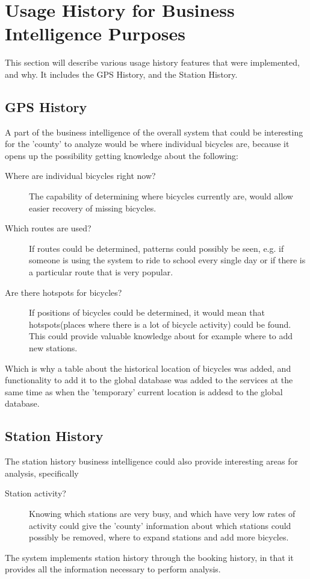 \section{Usage History for Business Intelligence Purposes}
This section will describe various usage history features that were implemented, and why. It includes the GPS History, and the Station History.

\subsection{GPS History}
A part of the business intelligence of the overall system that could be interesting for the 'county' to analyze would be where individual bicycles are, because it opens up the possibility getting knowledge about the following:

\begin{description}
\item[Where are individual bicycles right now?] The capability of determining where bicycles currently are, would allow easier recovery of missing bicycles.
\item[Which routes are used?] If routes could be determined, patterns could possibly be seen, e.g. if someone is using the system to ride to school every single day or if there is a particular route that is very popular.
\item[Are there hotspots for bicycles?] If positions of bicycles could be determined, it would mean that hotspots(places where there is a lot of bicycle activity) could be found. This could provide valuable knowledge about for example where to add new stations.
\end{description}

Which is why a table about the historical location of bicycles was added, and functionality to add it to the global database was added to the services at the same time as when the 'temporary' current location is addesd to the global database.

\subsection{Station History}
The station history business intelligence could also provide interesting areas for analysis, specifically

\begin{description}
\item[Station activity?] Knowing which stations are very busy, and which have very low rates of activity could give the 'county' information about which stations could possibly be removed, where to expand stations and add more bicycles.
\end{description}

The system implements station history through the booking history, in that it provides all the information necessary to perform analysis.